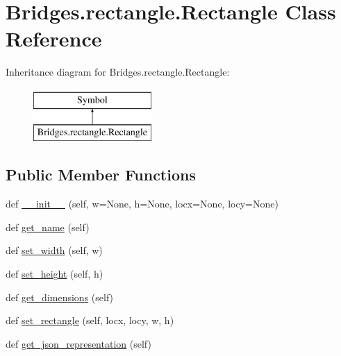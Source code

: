 \hypertarget{class_bridges_1_1rectangle_1_1_rectangle}{}\section{Bridges.\+rectangle.\+Rectangle Class Reference}
\label{class_bridges_1_1rectangle_1_1_rectangle}
Inheritance diagram for Bridges.\+rectangle.\+Rectangle\+:\begin{figure}[H]
\begin{center}
\leavevmode
\includegraphics[height=2.000000cm]{class_bridges_1_1rectangle_1_1_rectangle}
\end{center}
\end{figure}
\subsection*{Public Member Functions}
\begin{DoxyCompactItemize}
\item 
def \mbox{\hyperlink{class_bridges_1_1rectangle_1_1_rectangle_aac3556ec035b237c15365ff5a23206f3}{\+\_\+\+\_\+init\+\_\+\+\_\+}} (self, w=None, h=None, locx=None, locy=None)
\item 
def \mbox{\hyperlink{class_bridges_1_1rectangle_1_1_rectangle_a6f2180be9e39b4e8ebb83dde0d2ae2e1}{get\+\_\+name}} (self)
\item 
def \mbox{\hyperlink{class_bridges_1_1rectangle_1_1_rectangle_a2f856ecb4decb067e258e4e9f7b2ad00}{set\+\_\+width}} (self, w)
\item 
def \mbox{\hyperlink{class_bridges_1_1rectangle_1_1_rectangle_a43141b79a309d329a166ddd6125f3fb7}{set\+\_\+height}} (self, h)
\item 
def \mbox{\hyperlink{class_bridges_1_1rectangle_1_1_rectangle_a63c94bd3ac867e615755664e70020cac}{get\+\_\+dimensions}} (self)
\item 
def \mbox{\hyperlink{class_bridges_1_1rectangle_1_1_rectangle_a140506622c30bf1e384b4c3d71892351}{set\+\_\+rectangle}} (self, locx, locy, w, h)
\item 
def \mbox{\hyperlink{class_bridges_1_1rectangle_1_1_rectangle_a5d45f960a05924df3184abf86085392b}{get\+\_\+json\+\_\+representation}} (self)
\end{DoxyCompactItemize}
